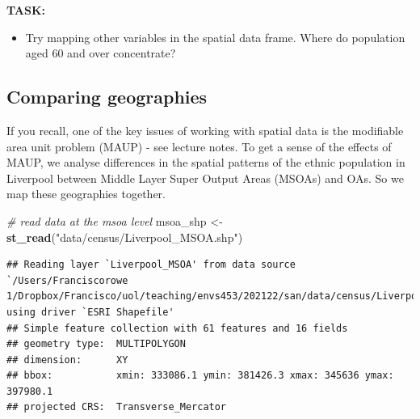 \documentclass[
]{book}
\newenvironment{Shaded}{\begin{snugshade}}{\end{snugshade}}
\newcommand{\CommentTok}[1]{\textcolor[rgb]{0.56,0.35,0.01}{\textit{#1}}}
\newcommand{\KeywordTok}[1]{\textcolor[rgb]{0.13,0.29,0.53}{\textbf{#1}}}
\newcommand{\NormalTok}[1]{#1}
\newcommand{\StringTok}[1]{\textcolor[rgb]{0.31,0.60,0.02}{#1}}
\providecommand{\tightlist}{%
  \setlength{\itemsep}{0pt}\setlength{\parskip}{0pt}}
\begin{document}
\textbf{TASK:}

\begin{itemize}
\tightlist
\item
  Try mapping other variables in the spatial data frame. Where do population aged 60 and over concentrate?
\end{itemize}

\hypertarget{comparing-geographies}{%
\subsection{Comparing geographies}\label{comparing-geographies}}

If you recall, one of the key issues of working with spatial data is the modifiable area unit problem (MAUP) - see lecture notes. To get a sense of the effects of MAUP, we analyse differences in the spatial patterns of the ethnic population in Liverpool between Middle Layer Super Output Areas (MSOAs) and OAs. So we map these geographies together.

\begin{Shaded}
\begin{Highlighting}[]
\CommentTok{# read data at the msoa level}
\NormalTok{msoa_shp <-}\StringTok{ }\KeywordTok{st_read}\NormalTok{(}\StringTok{"data/census/Liverpool_MSOA.shp"}\NormalTok{)}
\end{Highlighting}
\end{Shaded}

\begin{verbatim}
## Reading layer `Liverpool_MSOA' from data source `/Users/Franciscorowe 1/Dropbox/Francisco/uol/teaching/envs453/202122/san/data/census/Liverpool_MSOA.shp' using driver `ESRI Shapefile'
## Simple feature collection with 61 features and 16 fields
## geometry type:  MULTIPOLYGON
## dimension:      XY
## bbox:           xmin: 333086.1 ymin: 381426.3 xmax: 345636 ymax: 397980.1
## projected CRS:  Transverse_Mercator
\end{verbatim}
\end{document}
